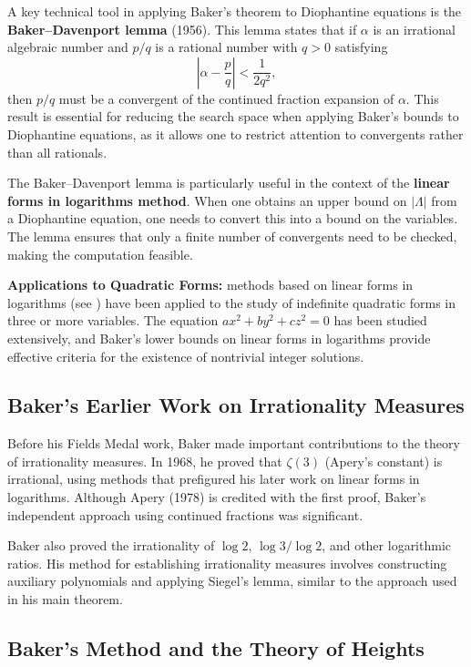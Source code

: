 A key technical tool in applying Baker's theorem to Diophantine equations is the \textbf{Baker--Davenport lemma} (1956). This lemma states that if $\alpha$ is an irrational algebraic number and $p/q$ is a rational number with $q > 0$ satisfying
\[
\left|\alpha - \frac{p}{q}\right| < \frac{1}{2q^2},
\]
then $p/q$ must be a convergent of the continued fraction expansion of $\alpha$. This result is essential for reducing the search space when applying Baker's bounds to Diophantine equations, as it allows one to restrict attention to convergents rather than all rationals.

The Baker--Davenport lemma is particularly useful in the context of the \textbf{linear forms in logarithms method}. When one obtains an upper bound on $|\Lambda|$ from a Diophantine equation, one needs to convert this into a bound on the variables. The lemma ensures that only a finite number of convergents need to be checked, making the computation feasible.

\textbf{Applications to Quadratic Forms:} methods based on linear forms in logarithms (see \cite{baker1966}) have been applied to the study of indefinite quadratic forms in three or more variables. The equation $ax^2 + by^2 + cz^2 = 0$ has been studied extensively, and Baker's lower bounds on linear forms in logarithms provide effective criteria for the existence of nontrivial integer solutions.

\subsection*{Baker's Earlier Work on Irrationality Measures}

Before his Fields Medal work, Baker made important contributions to the theory of irrationality measures. In 1968, he proved that $\zeta(3)$ (Apery's constant) is irrational, using methods that prefigured his later work on linear forms in logarithms. Although Apery (1978) is credited with the first proof, Baker's independent approach using continued fractions was significant.

Baker also proved the irrationality of $\log 2$, $\log 3 / \log 2$, and other logarithmic ratios. His method for establishing irrationality measures involves constructing auxiliary polynomials and applying Siegel's lemma, similar to the approach used in his main theorem.

\subsection*{Baker's Method and the Theory of Heights}

